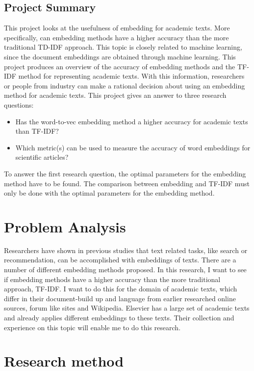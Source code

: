 \documentclass[10pt,a4paper]{article}
\begin{document}
\subsection{Project Summary}
This project looks at the usefulness of embedding for academic texts. More specifically, can embedding methods have a higher accuracy than the more traditional TD-IDF approach. This topic is closely related to machine learning, since the document embeddings are obtained through machine learning. This project produces an overview of the accuracy of embedding methods and the TF-IDF method for representing academic texts. With this information, researchers or people from industry can make a rational decision about using an embedding method for academic texts. This project gives an answer to three research questions:
\begin{itemize}
\item{Has the word-to-vec embedding method a higher accuracy for academic texts than TF-IDF?}
\item{Which metric(s) can be used to measure the accuracy of word embeddings for scientific articles?}
\end{itemize}
To answer the first research question, the optimal parameters for the embedding method have to be found. The comparison between embedding and TF-IDF must only be done with the optimal parameters for the embedding method.
\section{Problem Analysis}
Researchers have shown in previous studies that text related tasks, like search or recommendation, can be accomplished with embeddings of texts. There are a number of different embedding methods proposed. In this research, I want to see if embedding methods have a higher accuracy than the more traditional approach, TF-IDF. I want to do this for the domain of academic texts, which differ in their document-build up and language from earlier researched online sources, forum like sites and Wikipedia. Elsevier has a large set of academic texts and already applies different embeddings to these texts. Their collection and experience on this topic will enable me to do this research.

\section{Research method}
\end{document}
